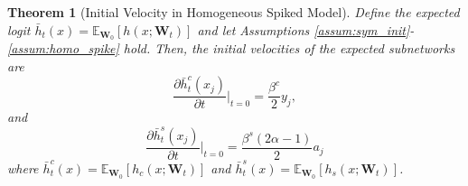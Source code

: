 \documentclass[letter,11pt]{article}
\newtheorem{theorem}{Theorem}
\begin{document}
\begin{theorem}[Initial Velocity in Homogeneous Spiked Model]\label{thm:homo_velocity}
    Define the expected logit $\bar{h}_t(x) = \mathbb{E}_{\mathbf{W}_0}[h(x; \mathbf{W}_t)]$ and let Assumptions \ref{assum:sym_init}-\ref{assum:homo_spike} hold. Then, the initial velocities of the expected subnetworks are
    \begin{equation}
        \frac{\partial \bar{h}_t^c(x_j)}{\partial t} \Big|_{t=0} = \frac{\beta^c}{2} y_j,
    \end{equation}
    and
\begin{equation}
    \frac{\partial \bar{h}_t^s(x_j)}{\partial t} \Big|_{t=0} = \frac{\beta^s (2\alpha - 1)}{2} a_j
\end{equation}
where $\bar{h}_t^c(x) = \mathbb{E}_{\mathbf{W}_0}[h_c(x; \mathbf{W}_t)]$ and $\bar{h}_t^s(x) = \mathbb{E}_{\mathbf{W}_0}[h_s(x; \mathbf{W}_t)]$.
\end{theorem}
\end{document}
